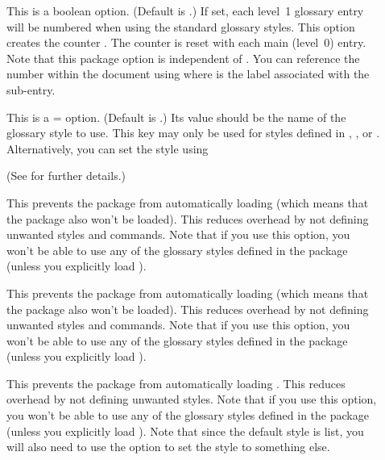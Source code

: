 \documentclass[report,inlinetitle]{nlctdoc}
\newcommand*{\glostyle}[1]{\textsf{#1}\index{glossary styles:>#1={\protect\ttfamily#1}|main}}
\begin{document}
\begin{description}
\item[] This is a boolean option. (Default
is .) If set, each level~1
glossary entry will be numbered when using the standard glossary
styles. This option creates the counter
.
The counter is reset with each main (level~0) entry. Note that this
package option is independent of . You can
reference the number within the document using
 where  is the label
associated with the sub-entry.

\item[] This is a = option.
(Default is .) Its value should be the name of
the glossary style to use. This key may only be used for styles
defined in , ,
 or . Alternatively, you can
set the style using
\begin{definition}
\end{definition}
(See  for further details.)

\item[] This prevents the  package
from automatically loading  (which means that
the  package also won't be loaded). This reduces
overhead by not defining unwanted styles and commands. Note that if
you use this option, you won't be able to use any of the
glossary styles defined in the  package (unless
you explicitly load ).

\item[] This prevents the  package
from automatically loading  (which means that
the  package also won't be loaded). This reduces
overhead by not defining unwanted styles and commands. Note that if
you use this option, you won't be able to use any of the
glossary styles defined in the  package
(unless you explicitly load ).

\item[] This prevents the  package
from automatically loading . This reduces
overhead by not defining unwanted styles. Note that if
you use this option, you won't be able to use any of the
glossary styles defined in the  package
(unless you explicitly load ).
Note that since the default style is \glostyle{list}, you will 
also need to use the  option to set the style to
something else.


\end{description}
\end{document}
